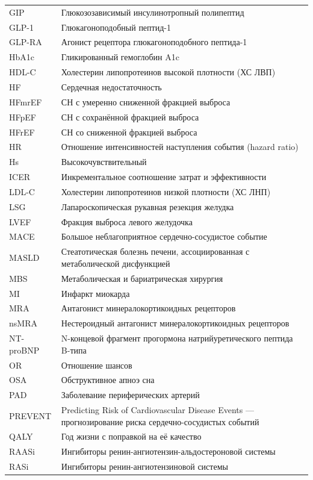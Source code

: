 \documentclass[11pt,a4paper]{article}
\begin{document}
{\begin{longtable}{P{0.18\textwidth}P{0.75\textwidth}}
GIP & Глюкозозависимый инсулинотропный полипептид\\
GLP-1 & Глюкагоноподобный пептид-1\\
GLP-RA & Агонист рецептора глюкагоноподобного пептида-1\\
HbA1c & Гликированный гемоглобин A1c\\
HDL-C & Холестерин липопротеинов высокой плотности (ХС ЛВП)\\
HF & Сердечная недостаточность\\
HFmrEF & СН с умеренно сниженной фракцией выброса\\
HFpEF & СН с сохранённой фракцией выброса\\
HFrEF & СН со сниженной фракцией выброса\\
HR & Отношение интенсивностей наступления события (hazard ratio)\\
Hs & Высокочувствительный\\
ICER & Инкрементальное соотношение затрат и эффективности\\
LDL-C & Холестерин липопротеинов низкой плотности (ХС ЛНП)\\
LSG & Лапароскопическая рукавная резекция желудка\\
LVEF & Фракция выброса левого желудочка\\
MACE & Большое неблагоприятное сердечно-сосудистое событие\\
MASLD & Стеатотическая болезнь печени, ассоциированная с метаболической дисфункцией\\
MBS & Метаболическая и бариатрическая хирургия\\
MI & Инфаркт миокарда\\
MRA & Антагонист минералокортикоидных рецепторов\\
nsMRA & Нестероидный антагонист минералокортикоидных рецепторов\\
NT-proBNP & N-концевой фрагмент прогормона натрийуретического пептида B-типа\\
OR & Отношение шансов\\
OSA & Обструктивное апноэ сна\\
PAD & Заболевание периферических артерий\\
PREVENT & Predicting Risk of Cardiovascular Disease Events --- прогнозирование риска сердечно-сосудистых событий\\
QALY & Год жизни с поправкой на её качество\\
RAASi & Ингибиторы ренин-ангиотензин-альдостероновой системы\\
RASi & Ингибиторы ренин-ангиотензиновой системы\\

\end{longtable}}
\end{document}
